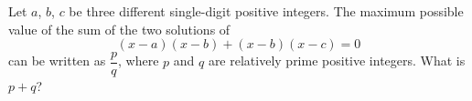 Let $a$, $b$, $c$ be three different single-digit positive integers. The maximum possible value of the sum of the two solutions of
\[(x-a)(x-b)+(x-b)(x-c)=0\]
can be written as $\dfrac {p}{q}$, where $p$ and $q$ are relatively prime positive integers. What is $p+q$?
